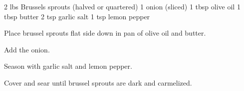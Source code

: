 \dishtype{\vegetarian}
\begin{ingreds}
    2 lbs Brussels sprouts (halved or quartered)
    1 onion (sliced) 
    1 tbsp olive oil
    1 tbsp butter
    2 tsp garlic salt
    1 tsp lemon pepper        
\end{ingreds}
\begin{method}
    Place brussel sprouts flat side down in pan of olive oil and butter.\par
    Add the onion.\par
    Season with garlic salt and lemon pepper.\par
    Cover and sear until brussel sprouts are dark and carmelized.
\end{method}